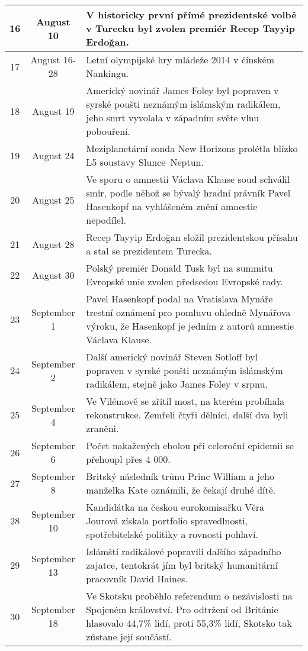 \begin{tabularx}{\linewidth}{@{}c @{}c X@{}}
16 & August 10 & V historicky první přímé prezidentské volbě v Turecku byl zvolen premiér Recep Tayyip Erdoğan. \\ \midrule
17 & August 16-28 & Letní olympijské hry mládeže 2014 v čínském Nankingu. \\ \midrule
18 & August 19 & Americký novinář James Foley byl popraven v syrské poušti neznámým islámským radikálem, jeho smrt vyvolala v západním světe vlnu pobouření. \\ \midrule
19 & August 24 & Meziplanetární sonda New Horizons prolétla blízko L5 soustavy Slunce–Neptun. \\ \midrule
20 & August 25 & Ve sporu o amnestii Václava Klause soud schválil smír, podle něhož se bývalý hradní právník Pavel Hasenkopf na vyhlášeném znění amnestie nepodílel. \\ \midrule
21 & August 28 & Recep Tayyip Erdoğan složil prezidentskou přísahu a stal se prezidentem Turecka. \\ \midrule
22 & August 30 & Polský premiér Donald Tusk byl na summitu Evropské unie zvolen předsedou Evropské rady. \\ \midrule
23 & September 1 & Pavel Hasenkopf podal na Vratislava Mynáře trestní oznámení pro pomluvu ohledně Mynářova výroku, že Hasenkopf je jedním z autorů amnestie Václava Klause. \\ \midrule
24 & September 2 & Další americký novinář Steven Sotloff byl popraven v syrské poušti neznámým islámským radikálem, stejně jako James Foley v srpnu. \\ \midrule
25 & September 4 & Ve Vilémově se zřítil most, na kterém probíhala rekonstrukce. Zemřeli čtyři dělníci, další dva byli zraněni. \\ \midrule
26 & September 6 & Počet nakažených ebolou při celoroční epidemii se přehoupl přes 4 000. \\ \midrule
27 & September 8 & Britský následník trůnu Princ William a jeho manželka Kate oznámili, že čekají druhé dítě. \\ \midrule
28 & September 10 & Kandidátka na českou eurokomisařku Věra Jourová získala portfolio spravedlnosti, spotřebitelské politiky a rovnosti pohlaví. \\ \midrule
29 & September 13 & Islámští radikálové popravili dalšího západního zajatce, tentokrát jím byl britský humanitární pracovník David Haines. \\ \midrule
30 & September 18 & Ve Skotsku proběhlo referendum o nezávislosti na Spojeném království. Pro odtržení od Británie hlasovalo 44,7\% lidí, proti 55,3\% lidí, Skotsko tak zůstane její součástí. \\ \midrule

\end{tabularx}
